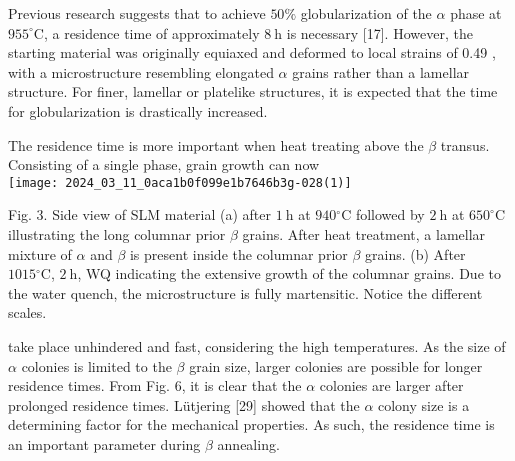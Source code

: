 \documentclass[10pt]{article}
\begin{document}
Previous research suggests that to achieve $50 \%$ globularization of the $\alpha$ phase at $955^{\circ} \mathrm{C}$, a residence time of approximately $8 \mathrm{~h}$ is necessary [17]. However, the starting material was originally equiaxed and deformed to local strains of 0.49 , with a microstructure resembling elongated $\alpha$ grains rather than a lamellar structure. For finer, lamellar or platelike structures, it is expected that the time for globularization is drastically increased.

The residence time is more important when heat treating above the $\beta$ transus. Consisting of a single phase, grain growth can now\\
\texttt{[image: 2024\_03\_11\_0aca1b0f099e1b7646b3g-028(1)]}

Fig. 3. Side view of SLM material (a) after $1 \mathrm{~h}$ at $940{ }^{\circ} \mathrm{C}$ followed by $2 \mathrm{~h}$ at $650^{\circ} \mathrm{C}$ illustrating the long columnar prior $\beta$ grains. After heat treatment, a lamellar mixture of $\alpha$ and $\beta$ is present inside the columnar prior $\beta$ grains. (b) After $1015{ }^{\circ} \mathrm{C}$, $2 \mathrm{~h}$, WQ indicating the extensive growth of the columnar grains. Due to the water quench, the microstructure is fully martensitic. Notice the different scales.

take place unhindered and fast, considering the high temperatures. As the size of $\alpha$ colonies is limited to the $\beta$ grain size, larger colonies are possible for longer residence times. From Fig. 6, it is clear that the $\alpha$ colonies are larger after prolonged residence times. Lütjering [29] showed that the $\alpha$ colony size is a determining factor for the mechanical properties. As such, the residence time is an important parameter during $\beta$ annealing.
\end{document}
